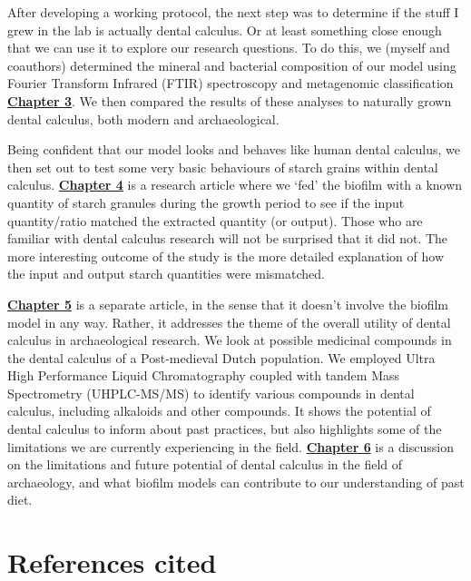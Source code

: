 \documentclass[
  b5paper,
]{book}
\begin{document}
After developing a working protocol, the next step was to determine if
the stuff I grew in the lab is actually dental calculus. Or at least
something close enough that we can use it to explore our research
questions. To do this, we (myself and coauthors) determined the mineral
and bacterial composition of our model using Fourier Transform Infrared
(FTIR) spectroscopy and metagenomic classification
\protect\hyperlink{byoc-valid}{\textbf{Chapter 3}}. We then compared the
results of these analyses to naturally grown dental calculus, both
modern and archaeological.

Being confident that our model looks and behaves like human dental
calculus, we then set out to test some very basic behaviours of starch
grains within dental calculus.
\protect\hyperlink{byoc-starch}{\textbf{Chapter 4}} is a research
article where we `fed' the biofilm with a known quantity of starch
granules during the growth period to see if the input quantity/ratio
matched the extracted quantity (or output). Those who are familiar with
dental calculus research will not be surprised that it did not. The more
interesting outcome of the study is the more detailed explanation of how
the input and output starch quantities were mismatched.

\protect\hyperlink{mb11CalculusPilot}{\textbf{Chapter 5}} is a separate
article, in the sense that it doesn't involve the biofilm model in any
way. Rather, it addresses the theme of the overall utility of dental
calculus in archaeological research. We look at possible medicinal
compounds in the dental calculus of a Post-medieval Dutch population. We
employed Ultra High Performance Liquid Chromatography coupled with
tandem Mass Spectrometry (UHPLC-MS/MS) to identify various compounds in
dental calculus, including alkaloids and other compounds. It shows the
potential of dental calculus to inform about past practices, but also
highlights some of the limitations we are currently experiencing in the
field. \protect\hyperlink{chap-discussion}{\textbf{Chapter 6}} is a
discussion on the limitations and future potential of dental calculus in
the field of archaeology, and what biofilm models can contribute to our
understanding of past diet.

\hypertarget{references-cited}{%
\section*{References cited}\label{references-cited}}
\end{document}

